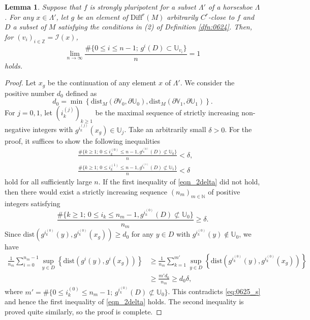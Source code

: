 \documentclass{amsart}
\newtheorem{lem}[thm]{Lemma}
\theoremstyle{definition}
\numberwithin{equation}{section}
\numberwithin{figure}{section}
\begin{document}
\begin{lem}\label{l_pluri_1}
Suppose that $f$ is strongly pluripotent for a subset $\Lambda'$ of a horseshoe $\Lambda$.
For any $x\in \Lambda'$, let $g$ be an element of $\mathrm{Diff}^r(M)$ arbitrarily $C^r$-close to $f$ and $D$ a subset of $M$ satisfying the conditions in (2) of Definition \ref{dfn:0624}.
Then, for $(v_i)_{i\in\mathbb{Z}}=\mathcal{I}(x)$,  
$$
\lim_{n\rightarrow \infty}
\frac{\#\bigl\{0\leq i\leq n-1;\, g^i(D)\subset {\mathbb{U}}_{v_i}\bigr\}}{n}=1
$$
holds.
\end{lem}
\begin{proof}
Let $x_g$ be the continuation of any element $x$ of $\Lambda'$.
We consider the positive number $d_{0}$ defined as
$$
d_0=\min\left\{\mathrm{dist}_M(\partial {\mathbb{V}}_0,\partial {\mathbb{U}}_0), \mathrm{dist}_M(\partial {\mathbb{V}}_1,\partial {\mathbb{U}}_1)\right\}.
$$
For $j=0,1$, let $(i_k^{(j)})_{k\geq 1}$ be the maximal sequence of strictly increasing non-negative integers with 
$g^{i_k^{(j)}}(x_g)\in {\mathbb{U}}_j$.
Take an arbitrarily small $\delta>0$.
For the proof, it suffices to show the following inequalities
\begin{equation}\label{eqn_2delta}
\begin{split}
&\frac{\#\bigl\{k\geq 1;\,0\leq i_k^{(0)}\leq n-1, g^{i_k^{(0)}}(D)\not\subset {\mathbb{U}}_0\bigr\}}{n}< \delta,\\
&\frac{\#\bigl\{k\geq 1;\,0\leq i_k^{(1)}\leq n-1, g^{i_k^{(1)}}(D)\not\subset {\mathbb{U}}_1\bigr\}}{n}< \delta
\end{split}
\end{equation}
hold for all sufficiently large $n$.
If the first inequality of \eqref{eqn_2delta} did not hold, then 
there would exist a strictly  
increasing sequence $(n_m)_{m\in \mathbb N}$ of positive integers satisfying 
$$
\frac{\#\bigl\{k\geq 1;\, 0\leq i_k\leq n_m-1, g^{i_k^{(0)}}(D)\not\subset {\mathbb{U}}_0\bigr\}}{n_m}\geq \delta.
$$
Since $\mathrm{dist}(g^{i_k^{(0)}}(y),g^{i_k^{(0)}}(x_g))\geq d_{0}$ for any $y \in D$ with $g^{i_k^{(0)}}(y)\not\in \mathbb{U}_{0}$, we have
\begin{align*}
\frac1{n_m}\sum_{i=0}^{n_m-1}\sup_{y\in D}\left\{\mathrm{dist}(g^i(y),g^i(x_g))\right\}&
\geq \frac1{n_m}\sum_{k=1}^{m'}\sup_{y\in D}\left\{\mathrm{dist}(g^{i_k^{(0)}}(y),g^{i_k^{(0)}}(x_g))\right\}\\
&\geq \frac{m'd_0}{n_m}\geq d_0\delta, 
\end{align*}
where $m'=\#\bigl\{0\leq i_k^{(0)}\leq n_m-1;\, g^{i_k^{(0)}}(D)\not\subset {\mathbb{U}}_0\bigr\}$.
This contradicts \eqref{eq:0625_s} and hence the first inequality of \eqref{eqn_2delta} holds.
The second inequality is proved quite similarly, so the proof is complete.
\end{proof}
\end{document}
